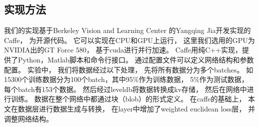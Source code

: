 \subsection{实现方法}
我们的实现基于Berkeley Vision and Learning Center 的Yangqing Jia开发实现的Caffe\cite{jia2014caffe}， 为开源代码。 它可以实现在CPU和GPU上运行， 这里我们选用的GPU为NVIDIA出的GT Force 580， 基于cuda进行并行加速。 Caffe用纯C++实现，提供了Python，Matlab脚本和命令行接口。 通过配置文件可以定义网络结构和参数配置。 实验中， 我们将数据经过以下处理， 先将所有数据分为多个batches。 如15300个训练数据分为100个batch，其中95\%作为训练数据， 5\%作为测试数据， 每个batch有153个数据。 然后经过leveldb将数据转换成kv存储， 然后在网络中进行训练。 数据在整个网络中都通过块（blob）的形式定义。 在caffe的基础上， 本文在数据层进行数据生成与转换， 在layer中增加了weighted euclidean loss层， 并调整网络结构。

